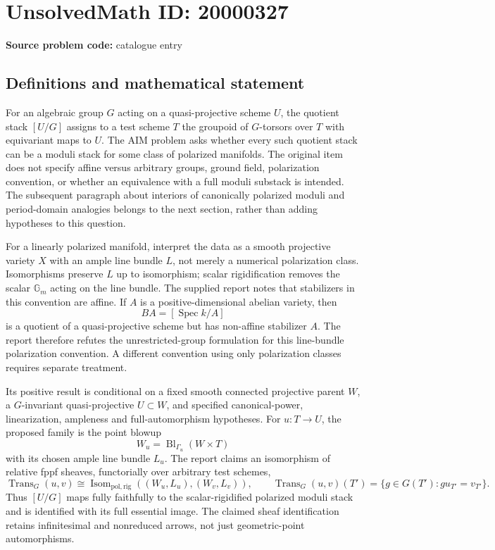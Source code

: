 \documentclass[11pt]{article}
\begin{document}
\section*{UnsolvedMath ID: 20000327}
\textbf{Source problem code:} catalogue entry
\subsection{Definitions and mathematical statement}
For an algebraic group $G$ acting on a quasi-projective scheme $U$, the quotient stack $[U/G]$ assigns to a test scheme $T$ the groupoid of $G$-torsors over $T$ with equivariant maps to $U$. The AIM problem asks whether every such quotient stack can be a moduli stack for some class of polarized manifolds. The original item does not specify affine versus arbitrary groups, ground field, polarization convention, or whether an equivalence with a full moduli substack is intended. The subsequent paragraph about interiors of canonically polarized moduli and period-domain analogies belongs to the next section, rather than adding hypotheses to this question.

For a linearly polarized manifold, interpret the data as a smooth projective variety $X$ with an ample line bundle $L$, not merely a numerical polarization class. Isomorphisms preserve $L$ up to isomorphism; scalar rigidification removes the scalar $\mathbb G_m$ acting on the line bundle. The supplied report notes that stabilizers in this convention are affine. If $A$ is a positive-dimensional abelian variety, then
\[
 BA=[\operatorname{Spec}k/A]
\]
is a quotient of a quasi-projective scheme but has non-affine stabilizer $A$. The report therefore refutes the unrestricted-group formulation for this line-bundle polarization convention. A different convention using only polarization classes requires separate treatment.

Its positive result is conditional on a fixed smooth connected projective parent $W$, a $G$-invariant quasi-projective $U\subset W$, and specified canonical-power, linearization, ampleness and full-automorphism hypotheses. For $u:T\to U$, the proposed family is the point blowup
\[
 W_u=\operatorname{Bl}_{\Gamma_u}(W\times T)
\]
with its chosen ample line bundle $L_u$. The report claims an isomorphism of relative fppf sheaves, functorially over arbitrary test schemes,
\[
 \operatorname{Trans}_G(u,v)\cong
 \operatorname{Isom}_{\mathrm{pol,rig}}((W_u,L_u),(W_v,L_v)),
 \qquad\operatorname{Trans}_G(u,v)(T')=
 \{g\in G(T'):g u_{T'}=v_{T'}\}.
\]
Thus $[U/G]$ maps fully faithfully to the scalar-rigidified polarized moduli stack and is identified with its full essential image. The claimed sheaf identification retains infinitesimal and nonreduced arrows, not just geometric-point automorphisms.
\end{document}
